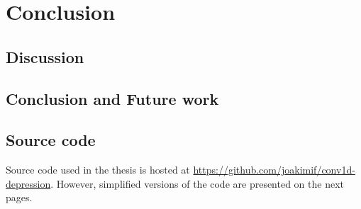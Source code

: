 \documentclass[UKenglish]{ifimaster}
\begin{document}
\part{Conclusion}
\chapter{Discussion}
\label{chapter:discussion}


\chapter{Conclusion and Future work}
\label{chapter:conclusion}


\backmatter{}
\printbibliography

\begin{appendices}
\chapter{Source code}
\label{appendix:source_code}
Source code used in the thesis is hosted at \url{https://github.com/joakimif/conv1d-depression}. However, simplified versions of the code are presented on the next pages.
\newpage

\newpage

\newpage

\end{appendices}
\end{document}
